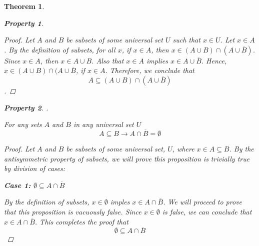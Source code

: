 \documentclass{book}
\newtheorem{theorem}{Theorem}[section]
\newtheorem{property}{Property}[theorem]
\theoremstyle{definition}
\theoremstyle{remark}
\begin{document}
\begin{theorem}
\begin{property}
        \begin{proof}
            Let $A$ and $B$ be subsets of some universal set $U$ such that $x \in U$. Let $x \in A$. By the definition of subsets, for all $x$, if $x \in A$, then $x \in (A \cup B) \cap (A \cup \overline{B})$. Since $x \in A$, then $x \in A \cup B$. Also that $x \in A$ implies $x \in A \cup \overline{B}$. Hence, $x \in (A \cup B) \cap (A \cup \overline{B}$, if $x \in A$. Therefore, we conclude that $$ A \subseteq (A \cup B) \cap (A \cup \overline{B}) $$.          
        \end{proof}
    \end{property}
    
    
    \newpage
    \begin{property}
    . \\
        \begin{tcolorbox}
            For any sets $A$ and $B$ in any universal set $U$
                \begin{equation*}
                    A \subseteq B \to A \cap \overline{B} = \emptyset
                \end{equation*}
        \end{tcolorbox}
    
        \begin{proof}
            Let $A$ and $B$ be subsets of some universal set, $U$, where $x \in A \subseteq B$. By the antisymmetric property of subsets, we will prove this proposition is trivially true by division of cases:
            
            \begin{flushleft} \textbf{Case 1: $\emptyset \subseteq A \cap \overline{B}$} \end{flushleft}
                By the definition of subsets, $x \in \emptyset$ imples $x \in A \cap \overline{B}$. We will proceed to prove that this proposition is vacuously false. Since $x \in \emptyset$ is false, we can conclude that $x \in A \cap \overline{B}$. This completes the proof that $$ \emptyset \subseteq A \cap \overline{B} $$
    

\end{proof}
\end{property}
\end{theorem}
\end{document}
